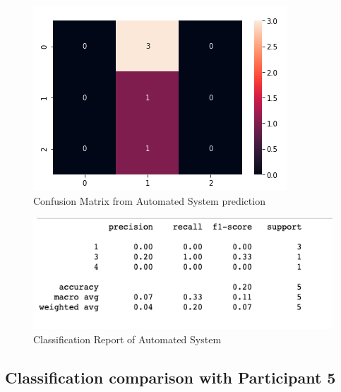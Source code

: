 \pagebreak

\begin{figure}[!htp]
    \includegraphics[width=\textwidth]{Images/a4.png}
    \caption{Confusion Matrix from Automated System prediction}
    \label{fig:f11}
\end{figure}

\begin{figure}[!htp]
    \includegraphics[width=\textwidth]{Images/a4r.png}
    \caption{Classification Report of Automated System}
    \label{fig:f11}
\end{figure}

\pagebreak
\subsection*{Classification comparison with Participant 5}

